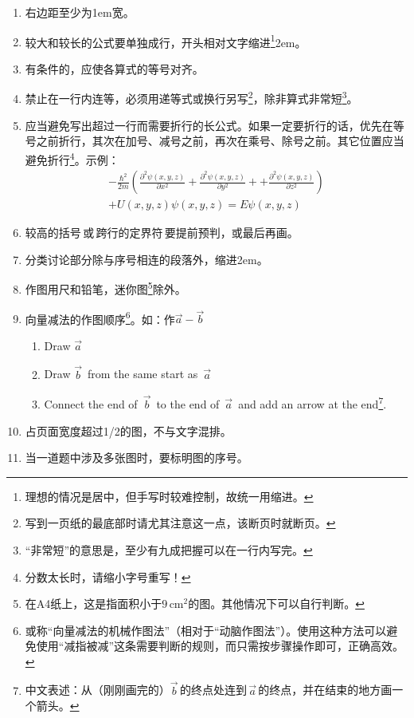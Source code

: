 \documentclass[11pt, a4paper]{article}
\begin{document}
\begin{enumerate}
\item 右边距至少为1em宽。
\item 较大和较长的公式要单独成行，开头相对文字缩进\footnote{理想的情况是居中，但手写时较难控制，故统一用缩进。}2em。
\item 有条件的，应使各算式的等号对齐。
\item 禁止在一行内连等，必须用递等式或换行另写\footnote{写到一页纸的最底部时请尤其注意这一点，该断页时就断页。}，除非算式非常短\footnote{“非常短”的意思是，至少有九成把握可以在一行内写完。}。
\item 应当避免写出超过一行而需要折行的长公式。如果一定要折行的话，优先在等号之前折行，其次在加号、减号之前，再次在乘号、除号之前。其它位置应当避免折行\footnote{分数太长时，请缩小字号重写！}。示例：
    \begin{multline*}
    -\frac{{\hbar}^{2}}{2m} \left( \frac{{\partial}^{2}\psi(x,y,z)}{\partial x^{2}} + \frac{{\partial}^{2}\psi(x,y,z)}{\partial y^{2}}+ + \frac{{\partial}^{2}\psi(x,y,z)}{\partial z^{2}} \right) \\
    + U(x,y,z)\psi(x,y,z) = E\psi(x,y,z)
    \end{multline*}
\item 较高的括号\,或\,跨行的定界符\,要提前预判，或最后再画。
\item 分类讨论部分除与序号相连的段落外，缩进2em。


\item 作图用尺和铅笔，迷你图\footnote{在A4纸上，这是指面积小于$9\,\mathrm{cm}^{2}$的图。其他情况下可以自行判断。}除外。
\item 向量减法的作图顺序\footnote{或称“向量减法的机械作图法”（相对于“动脑作图法”）。使用这种方法可以避免使用“减指被减”这条需要判断的规则，而只需按步骤操作即可，正确高效。}。如：作$\vec{a} - \vec{b}$
    \begin{enumerate}[label=(\roman*)]
    \item Draw $\vec{a}$
    \item Draw $\vec{b}\,$ from the same start as $\,\vec{a}$
    \item Connect the end of $\,\vec{b}\,$ to the end of $\,\vec{a}\,$ and add an arrow at the end\footnote{中文表述：从（刚刚画完的）$\vec{b}\,$的终点处连到$\,\vec{a}\,$的终点，并在结束的地方画一个箭头。}.
    \end{enumerate}
\item 占页面宽度超过1/2的图，不与文字混排。
\item 当一道题中涉及多张图时，要标明图的序号。



\end{enumerate}
\end{document}
